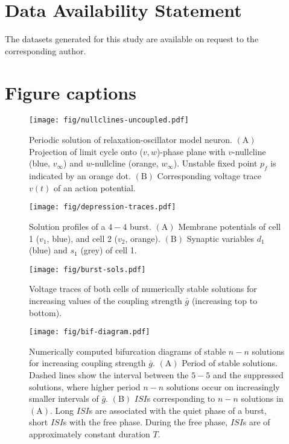 \documentclass[utf8, draft]{frontiersFPHY} %
\newcommand{\gbar}{\bar g}
\begin{document}
\section*{Data Availability Statement}
The datasets generated for this study are available on request to the corresponding author.



\section*{Figure captions}

\begin{figure}[h!]
  \centering
  \texttt{[image: fig/nullclines-uncoupled.pdf]}
  \caption{Periodic solution of relaxation-oscillator model neuron. $\bm{\mathrm{(A)}}$ Projection of limit cycle onto ($v,w$)-phase plane with $v$-nullcline (blue, $v_\infty$) and $w$-nullcline (orange, $w_\infty$). Unstable fixed point $p_{f}$ is indicated by an orange dot. $\bm{\mathrm{(B)}}$ Corresponding voltage trace $v(t)$ of an action potential.~\label{fig:nullclines}}
\end{figure}

\begin{figure}[h!]
  \centering
  \texttt{[image: fig/depression-traces.pdf]}
  \caption{Solution profiles of a $4-4$ burst. $\bm{\mathrm{(A)}}$ Membrane potentials of cell 1 ($v_{1}$, blue), and cell 2 ($v_{2}$, orange). $\bm{\mathrm{(B)}}$ Synaptic variables $d_{1}$ (blue) and $s_{1}$ (grey) of cell 1.~\label{fig:depression-traces}}
\end{figure}

\begin{figure}[h!]
  \centering
  \texttt{[image: fig/burst-sols.pdf]}
  \caption{Voltage traces of both cells of numerically stable solutions for increasing values of the coupling strength $\gbar$ (increasing top to bottom).~\label{fig:burst-sols}}
\end{figure}

\begin{figure}[h!]
  \centering
  \texttt{[image: fig/bif-diagram.pdf]}
  \caption{Numerically computed bifurcation diagrams of stable $n-n$ solutions for increasing coupling strength $\gbar$. $\bm{\mathrm{(A)}}$ Period of stable solutions. Dashed lines show the interval between the $5-5$ and the suppressed solutions, where higher period $n-n$ solutions occur on increasingly smaller intervals of $\gbar$. $\bm{\mathrm{(B)}}$ $ISI$s corresponding to $n-n$ solutions in $\mathrm{(A)}$. Long $ISI$s are associated with the quiet phase of a burst, short $ISI$s with the free phase. During the free phase, $ISI$s are of approximately constant duration $T$.\label{fig:bif-diagram}}
\end{figure}
\end{document}
